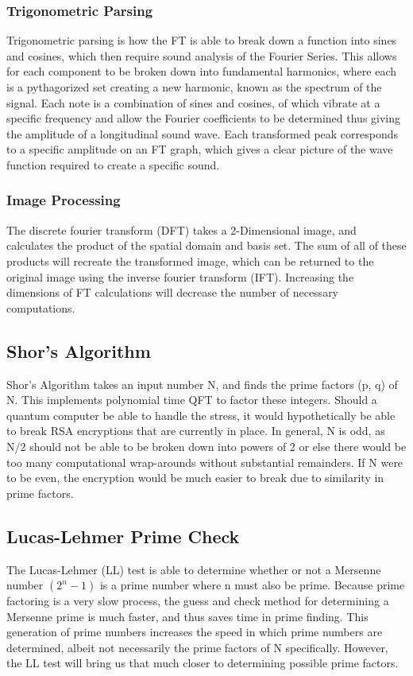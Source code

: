 \documentclass[a4paper,11pt]{article}
\theoremstyle{mytheor}
\begin{document}
\subsubsection{Trigonometric Parsing}
\cite{SF}
Trigonometric parsing is how the FT is able to break down a function into sines and cosines, which then require sound analysis of the Fourier Series.  This allows for each component to be broken down into fundamental harmonics, where each is a pythagorized set creating a new harmonic, known as the spectrum of the signal.  Each note is a combination of sines and cosines, of which vibrate at a specific frequency and allow the Fourier coefficients to be determined thus giving the amplitude of a longitudinal sound wave.  Each transformed peak corresponds to a specific amplitude on an FT graph, which gives a clear picture of the wave function required to create a specific sound.

\subsubsection{Image Processing}
\cite{Vision}\cite{PErr}\cite{Robo}\cite{Img}\cite{DIP}
The discrete fourier transform (DFT) takes a 2-Dimensional image, and calculates the product of the spatial domain and basis set.  The sum of all of these products will recreate the transformed image, which can be returned to the original image using the inverse fourier transform (IFT).  Increasing the dimensions of FT calculations will decrease the number of necessary computations.

\subsection{Shor's Algorithm}
\cite{C5}\cite{Prime}\cite{QCQI}\cite{DFa}
Shor’s Algorithm takes an input number N, and finds the prime factors (p, q) of N.  This implements polynomial time QFT to factor these integers.  Should a quantum computer be able to handle the stress, it would hypothetically be able to break RSA encryptions that are currently in place.  In general, N is odd, as N/2 should not be able to be broken down into powers of 2 or else there would be too many computational wrap-arounds without substantial remainders.  If N were to be even, the encryption would be much easier to break due to similarity in prime factors.  

\subsection{Lucas-Lehmer Prime Check}\label{sec:lehmer}
\cite{Prime}
The Lucas-Lehmer (LL) test is able to determine whether or not a Mersenne number $(2^n - 1)$ is a prime number where n must also be prime.  Because prime factoring is a very slow process, the guess and check method for determining a Mersenne prime is much faster, and thus saves time in prime finding.  This generation of prime numbers increases the speed in which prime numbers are determined, albeit not necessarily the prime factors of N specifically.  However, the LL test will bring us that much closer to determining possible prime factors.  
\end{document}

